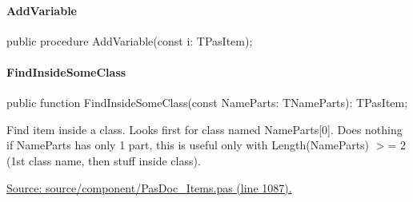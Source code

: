 \documentclass{report}
\newif\ifpdf
\begin{document}
\paragraph*{AddVariable}\hspace*{\fill}

\label{PasDoc_Items.TPasUnit-AddVariable}
\begin{list}{}{
\setlength{\itemindent}{0cm}
\setlength{\listparindent}{0cm}
\setlength{\leftmargin}{\evensidemargin}
\addtolength{\leftmargin}{\tmplength}
\settowidth{\labelsep}{X}
\addtolength{\leftmargin}{\labelsep}
\setlength{\labelwidth}{\tmplength}
}
\item[\textbf{Declaration}\hfill]
\ifpdf
\begin{flushleft}
\fi
\begin{ttfamily}
public procedure AddVariable(const i: TPasItem);\end{ttfamily}

\ifpdf
\end{flushleft}
\fi

\end{list}
\paragraph*{FindInsideSomeClass}\hspace*{\fill}

\label{PasDoc_Items.TPasUnit-FindInsideSomeClass}
\begin{list}{}{
\setlength{\itemindent}{0cm}
\setlength{\listparindent}{0cm}
\setlength{\leftmargin}{\evensidemargin}
\addtolength{\leftmargin}{\tmplength}
\settowidth{\labelsep}{X}
\addtolength{\leftmargin}{\labelsep}
\setlength{\labelwidth}{\tmplength}
}
\item[\textbf{Declaration}\hfill]
\ifpdf
\begin{flushleft}
\fi
\begin{ttfamily}
public function FindInsideSomeClass(const NameParts: TNameParts): TPasItem;\end{ttfamily}

\ifpdf
\end{flushleft}
\fi

\par
\item[\textbf{Description}]
Find item inside a class. Looks first for class named NameParts[0]. Does nothing if NameParts has only 1 part, this is useful only with Length(NameParts) {$>$}= 2 (1st class name, then stuff inside class).\par
\href{https://github.com/pasdoc/pasdoc/blob/master/source/component/PasDoc_Items.pas#L1087}{Source: source/component/PasDoc{\_}Items.pas (line 1087).}

\end{list}
\end{document}
